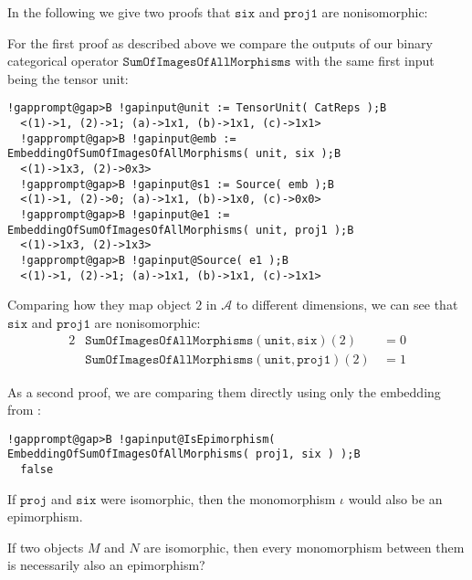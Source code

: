 \begin{computation}
In the following we give two proofs that $\mathtt{six}$ and $\mathtt{proj1}$ are nonisomorphic:

For the first proof as described above we compare the outputs of our binary categorical operator
$\mathtt{SumOfImagesOfAllMorphisms}$ with the same first input being the tensor unit:
\begin{Verbatim}[commandchars=!@B,fontsize=\small,frame=single,label=Example]
  !gapprompt@gap>B !gapinput@unit := TensorUnit( CatReps );B
  <(1)->1, (2)->1; (a)->1x1, (b)->1x1, (c)->1x1>
  !gapprompt@gap>B !gapinput@emb := EmbeddingOfSumOfImagesOfAllMorphisms( unit, six );B
  <(1)->1x3, (2)->0x3>
  !gapprompt@gap>B !gapinput@s1 := Source( emb );B
  <(1)->1, (2)->0; (a)->1x1, (b)->1x0, (c)->0x0>
  !gapprompt@gap>B !gapinput@e1 := EmbeddingOfSumOfImagesOfAllMorphisms( unit, proj1 );B
  <(1)->1x3, (2)->1x3>
  !gapprompt@gap>B !gapinput@Source( e1 );B
  <(1)->1, (2)->1; (a)->1x1, (b)->1x1, (c)->1x1>
\end{Verbatim}

Comparing how they map object $2$ in $\mathcal{A}$ to different dimensions, we can see that $\mathtt{six}$ and $\mathtt{proj1}$ are nonisomorphic:
\begin{alignat*}{2}
&\mathtt{SumOfImagesOfAllMorphisms}(\mathtt{unit},\mathtt{six})(2) &\,= 0 \\
&\mathtt{SumOfImagesOfAllMorphisms}(\mathtt{unit},\mathtt{proj1})(2) &\,= 1
\end{alignat*}

As a second proof, we are comparing them directly using only the embedding from :

\begin{Verbatim}[commandchars=!@B,fontsize=\small,frame=single,label=Example]
  !gapprompt@gap>B !gapinput@IsEpimorphism( EmbeddingOfSumOfImagesOfAllMorphisms( proj1, six ) );B
  false
\end{Verbatim}

If $\mathtt{proj}$ and $\mathtt{six}$ were isomorphic, then the monomorphism $\iota$ would also be an epimorphism.

If two objects $M$ and $N$ are isomorphic, then every monomorphism between them is necessarily also an epimorphism?

\end{computation}
